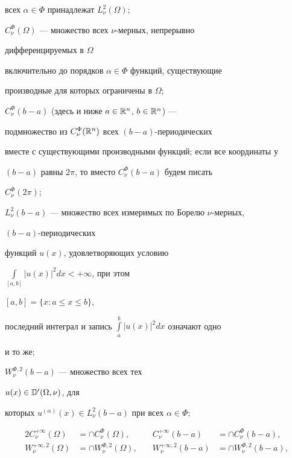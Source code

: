 всех $\alpha\in\Phi$ принадлежат $L^2_\nu(\Omega)$; 


 


$C^\Phi_\nu(\Omega)$ --- множество всех $\nu$-мерных, непрерывно 


дифференцируемых в $\Omega$ 


включительно до порядков $\alpha\in\Phi$ функций, существующие 


производные для которых ограничены в $\Omega$; 


 


$C^\Phi_\nu(b-a)$ (здесь и ниже $a\in\Bbb R^n$, $b\in\Bbb R^n$) --- 


подмножество из $C^\Phi_\nu(\Bbb R^n)$ всех $(b-a)$-периодических 


вместе с существующими производными функций; если все координаты у 


$(b-a)$ равны $2\pi$, то вместо $C^\Phi_\nu(b-a)$ будем писать 


$C^\Phi_\nu(2\pi)$; 


 


$L^2_\nu(b-a)$ --- множество всех измеримых по Борелю $\nu$-мерных, 


$(b-a)$-периодических 


функций $u(x)$, удовлетворяющих условию 


$\int\limits_{[a,b]}|u(x)|^2dx<+\infty$, при этом 


$[a,b]=\{x:a\le x\le b\}$, 


последний интеграл и запись $\int\limits^b_a|u(x)|^2dx$ означают одно 


и то же; 


 


$W^{\Phi,2}_\nu(b-a)$ --- множество всех тех 


$u(x)\in\Bbb D'(\Omega,\nu)$, для 


которых $u^{(\alpha)}(x)\in L^2_\nu(b-a)$ при всех $\alpha\in\Phi$; 


\begin{alignat*}{2} 


C^{+\infty}_\nu(\Omega)&=\cap C^\Phi_\nu(\Omega), &\quad 


C^{+\infty}_\nu(b-a)&=\cap C^\Phi_\nu(b-a),\\ 


W^{+\infty,2}_\nu(\Omega)&=\cap W^{\Phi,2}_\nu(\Omega), &\quad 


W^{+\infty,2}_\nu(b-a)&=\cap W^{\Phi,2}_\nu(b-a), 


\end{alignat*} 


